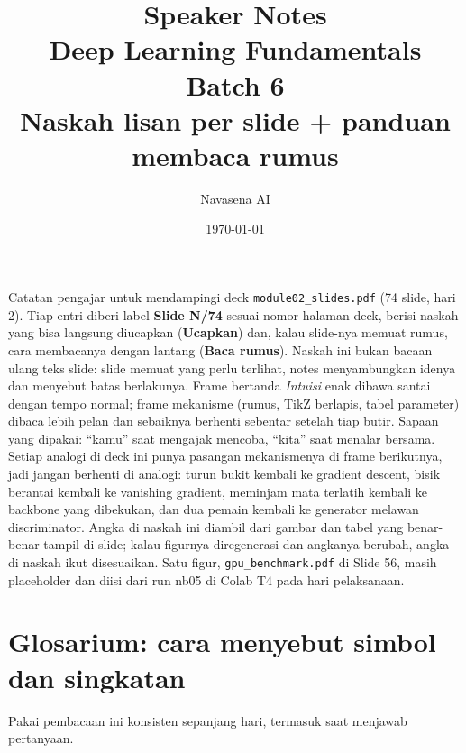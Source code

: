 \documentclass[11pt]{article}
\title{\textbf{Speaker Notes}\\[2mm]\large Deep Learning Fundamentals \textperiodcentered{} Batch 6\\[1mm]\normalsize Naskah lisan per slide + panduan membaca rumus}
\author{Navasena AI}
\date{\today}
\begin{document}
\maketitle
\thispagestyle{empty}

\noindent Catatan pengajar untuk mendampingi deck \texttt{module02\_slides.pdf} (74 slide, hari 2). Tiap entri diberi label \textbf{Slide N/74} sesuai nomor halaman deck, berisi naskah yang bisa langsung diucapkan (\textbf{Ucapkan}) dan, kalau slide-nya memuat rumus, cara membacanya dengan lantang (\textbf{Baca rumus}). Naskah ini bukan bacaan ulang teks slide: slide memuat yang perlu terlihat, notes menyambungkan idenya dan menyebut batas berlakunya. Frame bertanda \emph{Intuisi} enak dibawa santai dengan tempo normal; frame mekanisme (rumus, TikZ berlapis, tabel parameter) dibaca lebih pelan dan sebaiknya berhenti sebentar setelah tiap butir. Sapaan yang dipakai: ``kamu'' saat mengajak mencoba, ``kita'' saat menalar bersama. Setiap analogi di deck ini punya pasangan mekanismenya di frame berikutnya, jadi jangan berhenti di analogi: turun bukit kembali ke gradient descent, bisik berantai kembali ke vanishing gradient, meminjam mata terlatih kembali ke backbone yang dibekukan, dan dua pemain kembali ke generator melawan discriminator. Angka di naskah ini diambil dari gambar dan tabel yang benar-benar tampil di slide; kalau figurnya diregenerasi dan angkanya berubah, angka di naskah ikut disesuaikan. Satu figur, \texttt{gpu\_benchmark.pdf} di Slide 56, masih placeholder dan diisi dari run nb05 di Colab T4 pada hari pelaksanaan.

\vspace{4mm}
\section*{Glosarium: cara menyebut simbol dan singkatan}
Pakai pembacaan ini konsisten sepanjang hari, termasuk saat menjawab pertanyaan.
\end{document}
